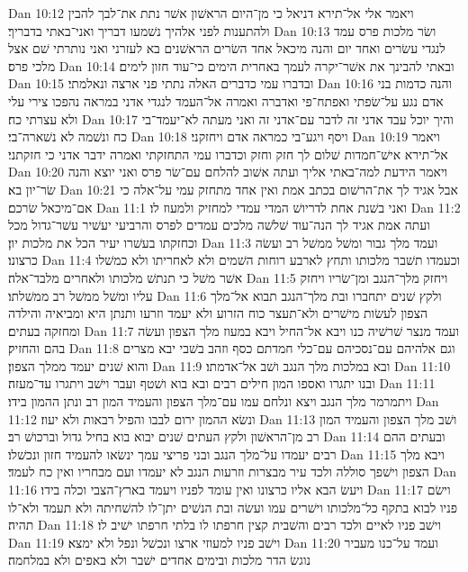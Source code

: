 Dan 10:12  ויאמר אלי אל־תירא דניאל כי מן־היום הראשׁון אשׁר נתת את־לבך להבין ולהתענות לפני אלהיך נשׁמעו דבריך ואני־באתי בדבריך׃
Dan 10:13  ושׂר מלכות פרס עמד לנגדי עשׂרים ואחד יום והנה מיכאל אחד השׂרים הראשׁנים בא לעזרני ואני נותרתי שׁם אצל מלכי פרס׃
Dan 10:14  ובאתי להבינך את אשׁר־יקרה לעמך באחרית הימים כי־עוד חזון לימים׃
Dan 10:15  ובדברו עמי כדברים האלה נתתי פני ארצה ונאלמתי׃
Dan 10:16  והנה כדמות בני אדם נגע על־שׂפתי ואפתח־פי ואדברה ואמרה אל־העמד לנגדי אדני במראה נהפכו צירי עלי ולא עצרתי כח׃
Dan 10:17  והיך יוכל עבד אדני זה לדבר עם־אדני זה ואני מעתה לא־יעמד־בי כח ונשׁמה לא נשׁארה־בי׃
Dan 10:18  ויסף ויגע־בי כמראה אדם ויחזקני׃
Dan 10:19  ויאמר אל־תירא אישׁ־חמדות שׁלום לך חזק וחזק וכדברו עמי התחזקתי ואמרה ידבר אדני כי חזקתני׃
Dan 10:20  ויאמר הידעת למה־באתי אליך ועתה אשׁוב להלחם עם־שׂר פרס ואני יוצא והנה שׂר־יון בא׃
Dan 10:21  אבל אגיד לך את־הרשׁום בכתב אמת ואין אחד מתחזק עמי על־אלה כי אם־מיכאל שׂרכם׃
Dan 11:1  ואני בשׁנת אחת לדריושׁ המדי עמדי למחזיק ולמעוז לו׃
Dan 11:2  ועתה אמת אגיד לך הנה־עוד שׁלשׁה מלכים עמדים לפרס והרביעי יעשׁיר עשׁר־גדול מכל וכחזקתו בעשׁרו יעיר הכל את מלכות יון׃
Dan 11:3  ועמד מלך גבור ומשׁל ממשׁל רב ועשׂה כרצונו׃
Dan 11:4  וכעמדו תשׁבר מלכותו ותחץ לארבע רוחות השׁמים ולא לאחריתו ולא כמשׁלו אשׁר משׁל כי תנתשׁ מלכותו ולאחרים מלבד־אלה׃
Dan 11:5  ויחזק מלך־הנגב ומן־שׂריו ויחזק עליו ומשׁל ממשׁל רב ממשׁלתו׃
Dan 11:6  ולקץ שׁנים יתחברו ובת מלך־הנגב תבוא אל־מלך הצפון לעשׂות מישׁרים ולא־תעצר כוח הזרוע ולא יעמד וזרעו ותנתן היא ומביאיה והילדה ומחזקה בעתים׃
Dan 11:7  ועמד מנצר שׁרשׁיה כנו ויבא אל־החיל ויבא במעוז מלך הצפון ועשׂה בהם והחזיק׃
Dan 11:8  וגם אלהיהם עם־נסכיהם עם־כלי חמדתם כסף וזהב בשׁבי יבא מצרים והוא שׁנים יעמד ממלך הצפון׃
Dan 11:9  ובא במלכות מלך הנגב ושׁב אל־אדמתו׃
Dan 11:10  ובנו יתגרו ואספו המון חילים רבים ובא בוא ושׁטף ועבר וישׁב ויתגרו עד־מעזה׃
Dan 11:11  ויתמרמר מלך הנגב ויצא ונלחם עמו עם־מלך הצפון והעמיד המון רב ונתן ההמון בידו׃
Dan 11:12  ונשׂא ההמון ירום לבבו והפיל רבאות ולא יעוז׃
Dan 11:13  ושׁב מלך הצפון והעמיד המון רב מן־הראשׁון ולקץ העתים שׁנים יבוא בוא בחיל גדול וברכושׁ רב׃
Dan 11:14  ובעתים ההם רבים יעמדו על־מלך הנגב ובני פריצי עמך ינשׂאו להעמיד חזון ונכשׁלו׃
Dan 11:15  ויבא מלך הצפון וישׁפך סוללה ולכד עיר מבצרות וזרעות הנגב לא יעמדו ועם מבחריו ואין כח לעמד׃
Dan 11:16  ויעשׂ הבא אליו כרצונו ואין עומד לפניו ויעמד בארץ־הצבי וכלה בידו׃
Dan 11:17  וישׂם פניו לבוא בתקף כל־מלכותו וישׁרים עמו ועשׂה ובת הנשׁים יתן־לו להשׁחיתה ולא תעמד ולא־לו תהיה׃
Dan 11:18  וישׁב פניו לאיים ולכד רבים והשׁבית קצין חרפתו לו בלתי חרפתו ישׁיב לו׃
Dan 11:19  וישׁב פניו למעוזי ארצו ונכשׁל ונפל ולא ימצא׃
Dan 11:20  ועמד על־כנו מעביר נוגשׂ הדר מלכות ובימים אחדים ישׁבר ולא באפים ולא במלחמה׃
